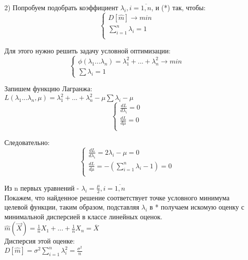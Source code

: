 2) Попробуем подобрать коэффициент $\lambda_{i}, i = \overline{1, n}$, и (*) так, чтобы:\\
\begin{equation}
\begin{cases}
D[\hat{m}] \rightarrow min\\
\sum\limits_{i=1}^{n} \lambda_{i} = 1\\
\end{cases}
\end{equation}

Для этого нужно решить задачу условной оптимизации:\\
\begin{equation}
\begin{cases}
\phi(\lambda_{1} ... \lambda_{n}) = \lambda_{1}^{2} + ... + \lambda_{n}^{2} \rightarrow min\\
\sum\lambda_{i} = 1
\end{cases}
\end{equation}

Запишем функцию Лагранжа:\\
$L(\lambda_{1} ... \lambda_{n}, \mu) = \lambda_{1}^{2} + ... + \lambda_{n}^{2} - \mu\sum\lambda_{i} - \mu$\\

\begin{equation}
\begin{cases}
\frac{dL}{d\lambda_{i}} = 0\\
\frac{dL}{d\mu} = 0\\
\end{cases}
\end{equation}

Следовательно:\\
\begin{equation}
\begin{cases}
\frac{dL}{d\lambda_{i}} = 2\lambda_{i} - \mu = 0\\
\frac{dL}{d\mu} = - (\sum\limits_{i=1}^{n} \lambda_{i} - 1) = 0\\
\end{cases}
\end{equation}

Из n первых уравнений - $\lambda_{i} = \frac{\mu}{2}, i = \overline{1, n}$\\

Покажем, что найденное решение соответствует точке условного минимума целевой функции, таким образом, подставляя $\lambda_{i}$ в * получаем искомую оценку с минимальной дисперсией в классе линейных оценок.\\
$\hat{m}(\overrightarrow{X}) = \frac{1}{n}X_{1} + ... + \frac{1}{n} X_{n} = \overline{X}$\\
Дисперсия этой оценке:\\
$D[\hat{m}] = \sigma^{2}\sum_{i=1}^{n}\lambda_{i}^{2} = \frac{\sigma^{2}}{n}$\\

